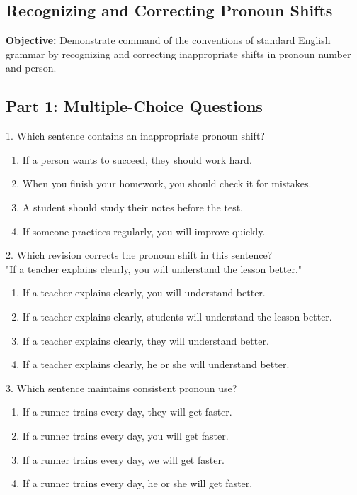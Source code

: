 \documentclass[12pt]{article}
\begin{document}
\subsection*{Recognizing and Correcting Pronoun Shifts}
\onehalfspacing

\begin{tcolorbox}[colframe=black!40, colback=gray!0, title=Learning Objective]
\textbf{Objective:} Demonstrate command of the conventions of standard English grammar by recognizing and correcting inappropriate shifts in pronoun number and person.
\end{tcolorbox}

\subsection*{Part 1: Multiple-Choice Questions}

1. Which sentence contains an inappropriate pronoun shift?  
\begin{enumerate}[label=\Alph*.]
    \item If a person wants to succeed, they should work hard.  
    \item When you finish your homework, you should check it for mistakes.  
    \item A student should study their notes before the test.  
    \item If someone practices regularly, you will improve quickly.  
\end{enumerate}

\vspace{1cm}

2. Which revision corrects the pronoun shift in this sentence?  
\\"If a teacher explains clearly, you will understand the lesson better."  
\begin{enumerate}[label=\Alph*.]
    \item If a teacher explains clearly, you will understand better.  
    \item If a teacher explains clearly, students will understand the lesson better.  
    \item If a teacher explains clearly, they will understand better.  
    \item If a teacher explains clearly, he or she will understand better.  
\end{enumerate}

\vspace{1cm}

3. Which sentence maintains consistent pronoun use?  
\begin{enumerate}[label=\Alph*.]
    \item If a runner trains every day, they will get faster.  
    \item If a runner trains every day, you will get faster.  
    \item If a runner trains every day, we will get faster.  
    \item If a runner trains every day, he or she will get faster.  
\end{enumerate}
\end{document}
